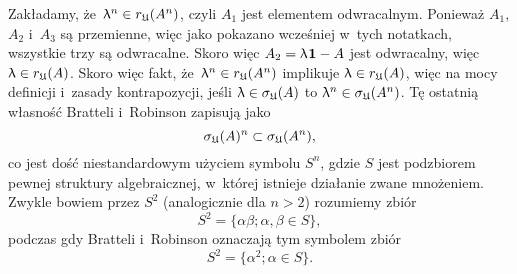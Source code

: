 \documentclass[a4paper,11pt]{article}
\renewcommand{\lambda}{\uplambda}
\begin{document}
Zakładamy, że~$\lambda^{ n } \in r_{ \Ufrak }( A^{ n } )$, czyli $A_{ 1 }$ jest
elementem odwracalnym. Ponieważ $A_{ 1 }$, $A_{ 2 }$ i~$A_{ 3 }$ są
przemienne, więc jako pokazano wcześniej w~tych notatkach, wszystkie trzy są
odwracalne. Skoro więc $A_{ 2 } = \lambda \HorSpaceOne \UnitAlg - A$ jest
odwracalny, więc $\lambda \in r_{ \Ufrak }( A )$. Skoro więc fakt,
że~$\lambda^{ n } \in r_{ \Ufrak }( A^{ n } )$ implikuje $\lambda \in r_{ \Ufrak }( A )$, więc na
mocy definicji i~zasady kontrapozycji, jeśli $\lambda \in \sigma_{ \Ufrak }( A )$ to
$\lambda^{ n } \in \sigma_{ \Ufrak }( A^{ n } )$. Tę ostatnią własność Bratteli i~Robinson
zapisują jako
\begin{equation}
  \label{eq:Bratteli-Robinson-Operator-Algebras-ETC-Vol-I-s01-57}
  \sigma_{ \mathfrak{U} }( A )^{ n } \subset \sigma_{ \mathfrak{U} }( A^{ n } ),
\end{equation}
co jest dość niestandardowym użyciem symbolu $S^{ n }$, gdzie $S$ jest
podzbiorem pewnej struktury algebraicznej, w~której istnieje działanie
zwane mnożeniem. Zwykle bowiem przez $S^{ 2 }$ (analogicznie dla $n > 2$)
rozumiemy zbiór
\begin{equation}
  \label{eq:Bratteli-Robinson-Operator-Algebras-ETC-Vol-I-s01-58}
  S^{ 2 } = \{ \alpha \beta; \alpha, \beta \in S \},
\end{equation}
podczas gdy Bratteli i~Robinson oznaczają tym symbolem zbiór
\begin{equation}
  \label{eq:Bratteli-Robinson-Operator-Algebras-ETC-Vol-I-s01-59}
  S^{ 2 } = \{ \alpha^{ 2 }; \alpha \in S \}.
\end{equation}

\VerSpaceFour






\newpage

\end{document}

